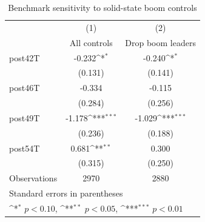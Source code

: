 \begin{table}[htbp]\centering
\def\sym#1{\ifmmode^{#1}\else\(^{#1}\)\fi}
\caption{Benchmark sensitivity to solid-state boom controls}
\begin{tabular}{l*{2}{c}}
\toprule
                    &\multicolumn{1}{c}{(1)}&\multicolumn{1}{c}{(2)}\\
                    &\multicolumn{1}{c}{All controls}&\multicolumn{1}{c}{Drop boom leaders}\\
\midrule
post42T             &      -0.232\sym{*}  &      -0.240\sym{*}  \\
                    &     (0.131)         &     (0.141)         \\
\addlinespace
post46T             &      -0.334         &      -0.115         \\
                    &     (0.284)         &     (0.256)         \\
\addlinespace
post49T             &      -1.178\sym{***}&      -1.029\sym{***}\\
                    &     (0.236)         &     (0.188)         \\
\addlinespace
post54T             &       0.681\sym{**} &       0.300         \\
                    &     (0.315)         &     (0.250)         \\
\midrule
Observations        &        2970         &        2880         \\
\bottomrule
\multicolumn{3}{l}{\footnotesize Standard errors in parentheses}\\
\multicolumn{3}{l}{\footnotesize \sym{*} \(p<0.10\), \sym{**} \(p<0.05\), \sym{***} \(p<0.01\)}\\
\end{tabular}
\end{table}
